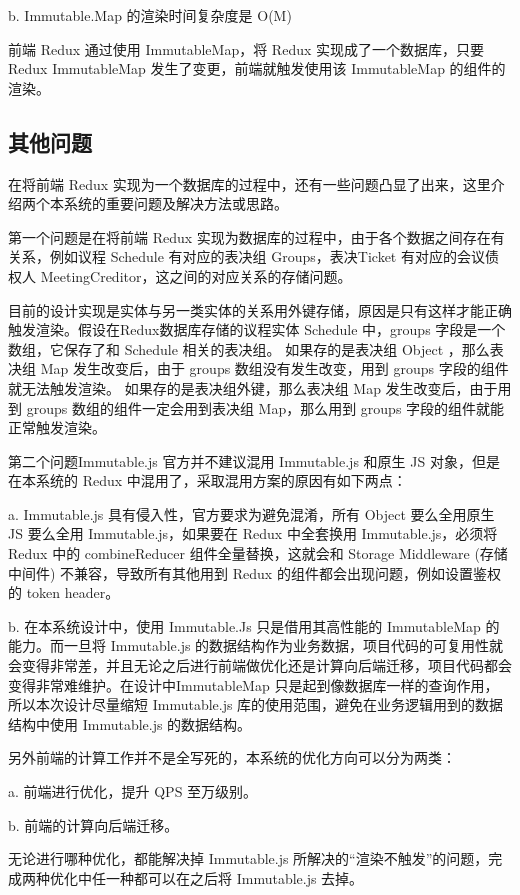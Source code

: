   \quad{}b. Immutable.Map 的渲染时间复杂度是 O(M)

  前端 Redux 通过使用 ImmutableMap，将 Redux 实现成了一个数据库，只要 Redux ImmutableMap 发生了变更，前端就触发使用该 ImmutableMap 的组件的渲染。

  \subsection{其他问题}
  在将前端 Redux 实现为一个数据库的过程中，还有一些问题凸显了出来，这里介绍两个本系统的重要问题及解决方法或思路。

  第一个问题是在将前端 Redux 实现为数据库的过程中，由于各个数据之间存在有关系，例如议程 Schedule 有对应的表决组 Groups，表决Ticket 有对应的会议债权人 MeetingCreditor，这之间的对应关系的存储问题。

  目前的设计实现是实体与另一类实体的关系用外键存储，原因是只有这样才能正确触发渲染。假设在Redux数据库存储的议程实体 Schedule 中，groups 字段是一个数组，它保存了和 Schedule 相关的表决组。
  如果存的是表决组 Object ，那么表决组 Map 发生改变后，由于 groups 数组没有发生改变，用到 groups 字段的组件就无法触发渲染。
  如果存的是表决组外键，那么表决组 Map 发生改变后，由于用到 groups 数组的组件一定会用到表决组 Map，那么用到 groups 字段的组件就能正常触发渲染。

  第二个问题Immutable.js 官方并不建议混用 Immutable.js 和原生 JS 对象，但是在本系统的 Redux 中混用了，采取混用方案的原因有如下两点：

  \quad{}a. Immutable.js 具有侵入性，官方要求为避免混淆，所有 Object 要么全用原生 JS 要么全用 Immutable.js，如果要在 Redux 中全套换用 Immutable.js，必须将 Redux 中的 combineReducer 组件全量替换，这就会和 Storage Middleware (存储中间件) 不兼容，导致所有其他用到 Redux 的组件都会出现问题，例如设置鉴权的 token header。


  \quad{}b. 在本系统设计中，使用 Immutable.Js 只是借用其高性能的 ImmutableMap 的能力。而一旦将 Immutable.js 的数据结构作为业务数据，项目代码的可复用性就会变得非常差，并且无论之后进行前端做优化还是计算向后端迁移，项目代码都会变得非常难维护。在设计中ImmutableMap 只是起到像数据库一样的查询作用，所以本次设计尽量缩短 Immutable.js 库的使用范围，避免在业务逻辑用到的数据结构中使用 Immutable.js 的数据结构。

  另外前端的计算工作并不是全写死的，本系统的优化方向可以分为两类：

  \quad{}a. 前端进行优化，提升 QPS 至万级别。

  \quad{}b. 前端的计算向后端迁移。

  无论进行哪种优化，都能解决掉 Immutable.js 所解决的“渲染不触发”的问题，完成两种优化中任一种都可以在之后将 Immutable.js 去掉。

